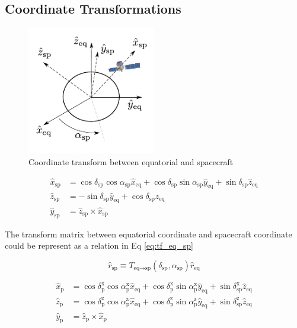 \subsection{Coordinate Transformations}


\begin{figure}[h!]
    \centering
    \includegraphics[width=0.5\textwidth]{img/fig_coordinate/coord_eq_sp.pdf}
    \caption{Coordinate transform between equatorial and spacecraft}
\end{figure}

\begin{equation}
    \begin{split}
    \hat{x}_\text{sp} &= \cos\delta_\text{sp}\cos\alpha_\text{sp}\hat{x}_\text{eq} + \cos\delta_\text{sp}\sin\alpha_\text{sp}\hat{y}_\text{eq} + \sin\delta_\text{sp}\hat{z}_\text{eq}\\
    \hat{z}_\text{sp} &= - \sin\delta_\text{sp}\hat{y}_\text{eq} + \cos\delta_\text{sp}\hat{z}_\text{eq} \\
    \hat{y}_\text{sp} &= \hat{z}_\text{sp} \times \hat{x}_\text{sp}
    \end{split}
    \label{eq:tf_eq_sp}
\end{equation}

The transform matrix between equatorial coordinate and spacecraft coordinate could be represent as a relation in Eq \ref{eq:tf_eq_sp}

\begin{equation}
    \hat{r}_\text{sp} \equiv T_{\text{eq}\rightarrow\text{sp}} (\delta_\text{sp}, \alpha_\text{sp}) \hat{r}_\text{eq}
\end{equation}

\begin{equation}
    \begin{split}
    \hat{x}_\text{p} &= \cos\delta^\text{x}_\text{p}\cos\alpha^\text{x}_\text{p}\hat{x}_\text{eq} + \cos\delta^\text{x}_\text{p}\sin\alpha^\text{x}_\text{p}\hat{y}_\text{eq} + \sin\delta^\text{x}_\text{sp}\hat{z}_\text{eq}\\
    \hat{z}_\text{p} &= \cos\delta^\text{z}_\text{p}\cos\alpha^\text{z}_\text{p}\hat{x}_\text{eq} + \cos\delta^\text{z}_\text{p}\sin\alpha^\text{z}_\text{p}\hat{y}_\text{eq} + \sin\delta^\text{z}_\text{sp}\hat{z}_\text{eq}\\
    \hat{y}_\text{p} &= \hat{z}_\text{p} \times \hat{x}_\text{p}
    \end{split}
    \label{eq:tf_eq_p}
\end{equation}

